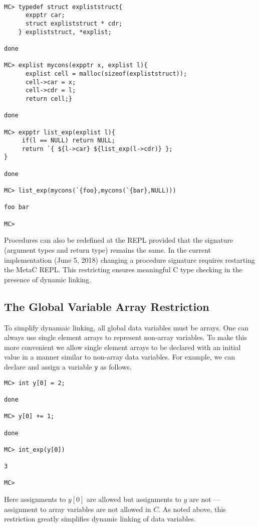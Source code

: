 \documentclass{article}
\begin{document}
\begin{verbatim}

MC> typedef struct expliststruct{
      expptr car;
      struct expliststruct * cdr;
    } expliststruct, *explist;

done

MC> explist mycons(expptr x, explist l){
      explist cell = malloc(sizeof(expliststruct));
      cell->car = x;
      cell->cdr = l;
      return cell;}

done

MC> expptr list_exp(explist l){
     if(l == NULL) return NULL;
     return `{ ${l->car} ${list_exp(l->cdr)} };
}

done

MC> list_exp(mycons(`{foo},mycons(`{bar},NULL)))

foo bar

MC>
\end{verbatim}

Procedures can also be redefined at the REPL provided that the
signature (argument types and return type) remains the same.  In the
current implementation (June 5, 2018) changing a procedure signature
requires restarting the MetaC REPL.  This restricting ensures
meaningful C type checking in the presence of dynamic linking.

\subsection{The Global Variable Array Restriction}

To simplify dynamaic linking, all global data
variables must be arrays. One can always use single element
arrays to represent non-array variables.  To make this more convenient
we allow single element arrays to be declared with an initial value in a
manner similar to non-array data variables.  For example, we can declare and assign a variable {\tt y}
as follows.

\begin{verbatim}
MC> int y[0] = 2;

done

MC> y[0] += 1;

done

MC> int_exp(y[0])

3

MC>
\end{verbatim}

Here assignments to $y[0]$ are allowed but assignments to $y$ are not --- assignment to array variables
are not allowed in $C$. As noted above, this restriction greatly simplifies dynamic linking of data variables.
\end{document}
